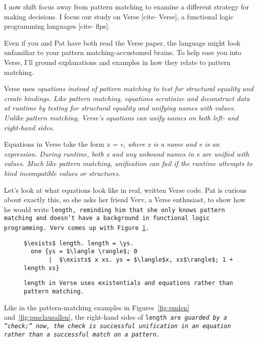 \documentclass[manuscript,screen,review, 12pt]{acmart}
\begin{document}
    
    
    I now shift focus away from pattern matching to examine a different strategy
    for making decisions. I focus our study on Verse [cite- Verse], a functional
    logic programming languages [cite- flps]. 

    Even if you and Pat have both read the Verse paper, the language might look
    unfamiliar to your pattern matching-accustomed brains. To help ease you into
    Verse, I'll ground explanations and examples in how they relate to pattern
    matching. 

    Verse uses \it{equations} instead of pattern matching to test for structural
    equality and create bindings. Like pattern matching, equations scrutinize
    and deconstruct data at runtime by testing for structural equality and
    unifying names with values. Unlike pattern matching, Verse's equations can
    unify names on both left- \it{and} right-hand sides. 
    
    Equations in Verse take the form \it{x = e}, where \it{x} is a name and
    \it{e} is an expression. During runtime, both \it{x} and any unbound names
    in \it{e} are unified with values. Much like pattern matching, unification
    can fail if the runtime attempts to bind incompatible values or structures. 

    Let's look at what equations look like in real, written Verse code. Pat is
    curious about exactly this, so she asks her friend Verv, a Verse enthusiast,
    to show how he would write \tt{length}, reminding him that she only knows
    pattern matching and doesn't have a background in functional logic
    programming. Verv comes up with Figure~\ref{fig:verselen}. 
    
    

    \begin{figure}[h]
        \verselst
        \begin{lstlisting}[numbers=none]
$\exists$ length. length = \ys. 
  one {ys = $\langle \rangle$; 0
       |  $\exists$ x xs. ys = $\langle$x, xs$\rangle$; 1 + length xs}
        \end{lstlisting}
    \caption{\tt{length} in Verse uses existentials and equations rather than
    pattern matching.} 
    \label{fig:verselen}
    \end{figure}

    Like in the pattern-matching examples in Figures~\ref{fig:pmlen}
    and~\ref{fig:pmclausallen}, the right-hand sides of \tt{length} are
    \it{guarded} by a “check;” now, the check is successful unification in an
    equation rather than a successful match on a pattern. 
\end{document}
